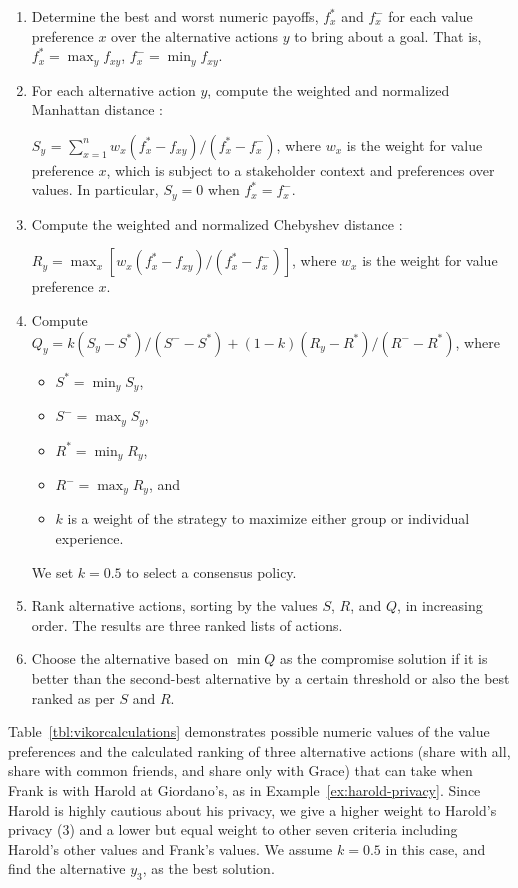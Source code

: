 \begin{enumerate}
\item Determine the best  and worst numeric payoffs, $f_x^*$ and $f_x^-$ for each value preference $x$ over the alternative actions $y$ to bring about a goal. That is, $f_x^* = {\max}_y f_{xy}$, $f_x^- = {\min}_y f_{xy}$.

\item For each alternative action $y$, compute the weighted and normalized Manhattan distance \citep{krause1973taxicab}:

$S_y$ = $\sum_{x=1}^{n} w_x(f_x^* - f_{xy})/(f_x^* - f_x^-)$, where $w_x$ is the weight for value preference $x$, which is subject to a stakeholder context and preferences over values. In particular, $S_y=0$ when $f_x^* = f_x^-$.

\item Compute the weighted and normalized Chebyshev distance \citep{cantrell2000modern}: 

$R_y ={\max}_x [w_x(f_x^* - f_{xy})/(f_x^* - f_x^-)]$, where $w_x$ is the weight for value preference $x$.

\item Compute $Q_y = k(S_y - S^*)/(S^- - S^*) + (1-k)(R_y - R^*)/(R^- - R^*)$, where 
\begin{itemize}
    \item $S^* = {\min}_y S_y$, 
    \item $S^- = {\max}_y S_y$, 
    \item $R^* = {\min}_y R_y$, 
    \item $R^- = {\max}_y R_y$, and 
    \item $k$ is a weight of the strategy to maximize either group or individual experience.
\end{itemize}  
We set $k = 0.5$ to select a consensus policy. 

\item Rank alternative actions, sorting by the values $S$, $R$, and $Q$, in increasing order. The results are three ranked lists of actions. 

\item Choose the alternative based on $\min{Q}$ as the compromise solution if it is better than the second-best alternative by a certain threshold or also the best ranked as per $S$ and $R$. 
\end{enumerate}

Table~\ref{tbl:vikorcalculations} demonstrates possible numeric values of the value preferences and the calculated ranking of three alternative actions (share with all, share with common friends, and share only with Grace) that \locationapp can take when Frank is with Harold at Giordano's, as in Example~\ref{ex:harold-privacy}. Since Harold is highly cautious about his privacy, we give a higher weight to Harold's privacy (3) and a lower but equal weight to other seven criteria including Harold's other values and Frank's values. We assume $k=0.5$ in this case, and find the alternative $y_3$,  as the best solution.

